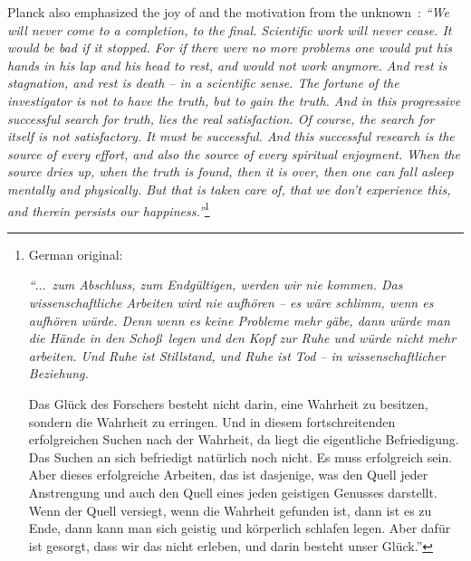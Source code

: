 Planck also emphasized the joy of and the motivation from the unknown~\cite{planck-1942}:
{\em
``We will never come to a completion, to the final.
Scientific work will never cease.
It would be bad if it stopped.
For if there were no more problems  one would put his hands in his lap and his head to rest,
and would not work anymore.
And rest is stagnation, and rest is death -- in a scientific sense.
The fortune of the investigator is not to have the truth, but to gain the truth.
And in this progressive successful search for truth,
lies the real satisfaction. Of course, the search for itself is not satisfactory.
It must be successful.
And this successful research is the source of every effort, and also the source of every spiritual enjoyment.
When the source dries up, when the truth is found,
then it is over, then one can fall asleep mentally and physically.
But that is taken care of, that we don't experience this, and therein persists our happiness.''}\footnote{German original:
{\em
``$\ldots$~zum Abschluss, zum Endg\"ultigen, werden wir nie kommen.
Das wissenschaftliche Arbeiten wird nie aufh\"oren --
es w\"are schlimm, wenn es aufh\"oren w\"urde.
Denn wenn es keine Probleme mehr g\"abe, dann w\"urde man die H\"ande in den Scho\ss~legen und den Kopf zur Ruhe und w\"urde
nicht mehr arbeiten. Und Ruhe ist Stillstand, und Ruhe ist Tod -- in
wissenschaftlicher Beziehung.

Das Gl\"uck des Forschers besteht nicht darin,
eine Wahrheit zu besitzen, sondern die Wahrheit zu erringen.
Und in diesem fortschreitenden erfolgreichen Suchen nach der Wahrheit,
da liegt die eigentliche Befriedigung. Das Suchen an sich befriedigt nat\"urlich noch nicht.
Es muss erfolgreich sein.
Aber dieses erfolgreiche Arbeiten, das ist dasjenige,
was den Quell jeder Anstrengung und auch den Quell eines jeden geistigen Genusses darstellt.
Wenn der Quell versiegt, wenn die Wahrheit gefunden ist,
dann ist es zu Ende, dann kann man sich geistig und k\"orperlich schlafen legen.
Aber daf\"ur ist gesorgt, dass wir das nicht erleben, und darin besteht unser Gl\"uck.''}
}
